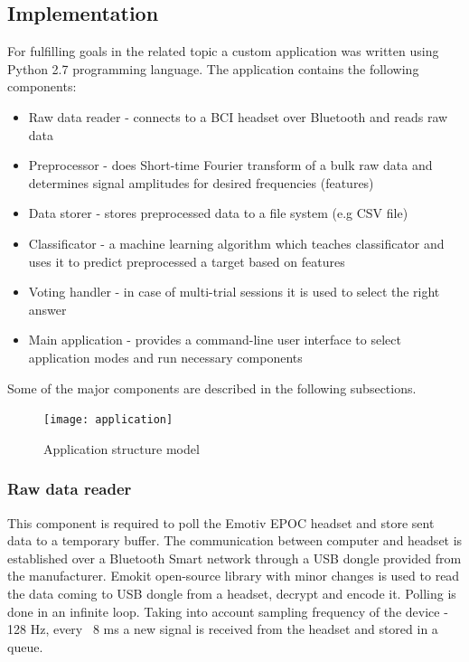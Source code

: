 \documentclass[12pt]{article}
\begin{document}
\subsection{Implementation}

For fulfilling goals in the related topic a custom application was written using Python 2.7 programming language. The application contains the following components:
\begin{itemize}
\item Raw data reader - connects to a BCI headset over Bluetooth and reads raw data
\item Preprocessor -  does Short-time Fourier transform of a bulk raw data and determines signal amplitudes for desired frequencies (features)
\item Data storer - stores preprocessed data to a file system (e.g CSV file)
\item Classificator - a machine learning algorithm which teaches classificator and uses it to predict preprocessed a target based on features
\item Voting handler - in case of multi-trial sessions it is used to select the right answer
\item Main application - provides a command-line user interface to select application modes and run necessary components
\end{itemize}

Some of the major components are described in the following subsections.
\begin{figure} [ht]
\begin{center}
\texttt{[image: application]}
\caption{Application structure model}
\label{fig:fnCompModel}
\end{center}
\end{figure}

\subsubsection{Raw data reader}

This component is required to poll the Emotiv EPOC headset and store sent data to a temporary buffer. The communication between computer and headset is established over a Bluetooth Smart network through a USB dongle provided from the manufacturer. Emokit\cite{emokit} open-source library with minor changes is used to read the data coming to USB dongle from a headset, decrypt and encode it. Polling is done in an infinite loop. Taking into account sampling frequency of the device - 128 Hz, every ~8 ms a new signal is received from the headset and stored in a queue.
\end{document}
